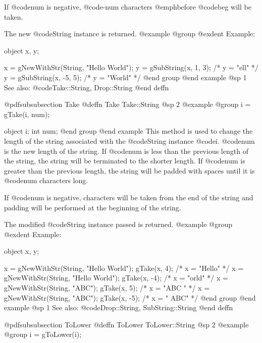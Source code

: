 If @code{num} is negative, @code{-num} characters @emph{before} @code{beg}
will be taken.

The new @code{String} instance is returned.
@example
@group
@exdent Example:

object  x, y;

x = gNewWithStr(String, "Hello World");
y = gSubString(x, 1, 3);   /*  y = "ell"    */
y = gSubString(x, -5, 5);  /*  y = "World"  */
@end group
@end example
@sp 1
See also:  @code{Take::String, Drop::String}
@end deffn











@pdfsubsubsection {Take}
@deffn {Take} Take::String
@sp 2
@example
@group
i = gTake(i, num);

object  i;
int     num;
@end group
@end example
This method is used to change the length of the string associated with
the @code{String} instance @code{i}.  @code{num} is the new length of
the string.  If @code{num} is less than the previous length of the
string, the string will be terminated to the shorter length.  If
@code{num} is greater than the previous length, the string will be padded
with spaces until it is @code{num} characters long.

If @code{num} is negative, characters will be taken from the end of the
string and padding will be performed at the beginning of the string.

The modified @code{String} instance passed is returned.
@example
@group
@exdent Example:

object  x, y;

x = gNewWithStr(String, "Hello World");
gTake(x, 4);   /*  x = "Hello"    */
x = gNewWithStr(String, "Hello World");
gTake(x, -4);   /*  x = "orld"    */
x = gNewWithStr(String, "ABC");
gTake(x, 5);   /*  x = "ABC  "    */
x = gNewWithStr(String, "ABC");
gTake(x, -5);   /*  x = "  ABC"    */
@end group
@end example
@sp 1
See also:  @code{Drop::String, SubString::String}
@end deffn















@pdfsubsubsection {ToLower}
@deffn {ToLower} ToLower::String
@sp 2
@example
@group
i = gToLower(i);

